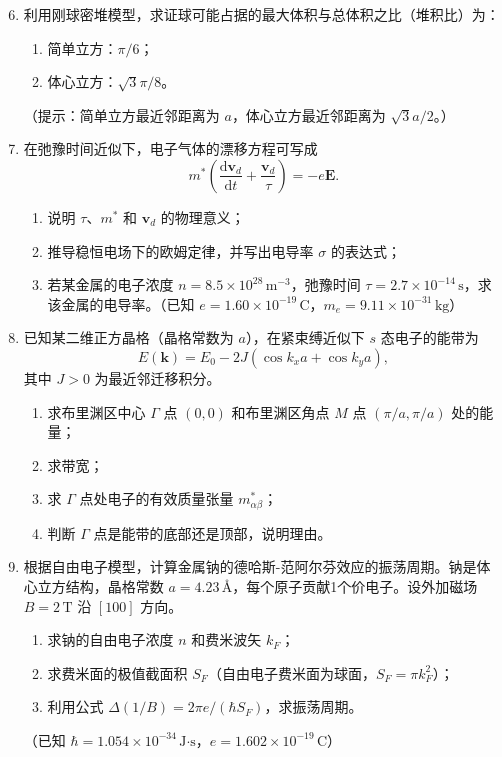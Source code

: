 \documentclass[12pt,a4paper,fontset=mac]{ctexart}
\newcommand{\kk}{\mathbf{k}}
\newcommand{\dd}{\mathrm{d}}
\newcommand{\calcanswer}{\vspace{8cm}}
\begin{document}
\begin{enumerate}
\setcounter{enumi}{5}
\item 利用刚球密堆模型，求证球可能占据的最大体积与总体积之比（堆积比）为：
\begin{enumerate}
\item 简单立方：$\pi/6$；
\item 体心立方：$\sqrt{3}\pi/8$。
\end{enumerate}
（提示：简单立方最近邻距离为 $a$，体心立方最近邻距离为 $\sqrt{3}a/2$。）
\calcanswer

\item 在弛豫时间近似下，电子气体的漂移方程可写成
\[
m^*\left(\frac{\dd\mathbf{v}_d}{\dd t} + \frac{\mathbf{v}_d}{\tau}\right) = -e\mathbf{E}.
\]
\begin{enumerate}
\item 说明 $\tau$、$m^*$ 和 $\mathbf{v}_d$ 的物理意义；
\item 推导稳恒电场下的欧姆定律，并写出电导率 $\sigma$ 的表达式；
\item 若某金属的电子浓度 $n = 8.5 \times 10^{28}\,\text{m}^{-3}$，弛豫时间 $\tau = 2.7 \times 10^{-14}\,\text{s}$，求该金属的电导率。（已知 $e = 1.60 \times 10^{-19}\,\text{C}$，$m_e = 9.11 \times 10^{-31}\,\text{kg}$）
\end{enumerate}
\calcanswer

\newpage

\item 已知某二维正方晶格（晶格常数为 $a$），在紧束缚近似下 $s$ 态电子的能带为
\[
E(\kk) = E_0 - 2J(\cos k_x a + \cos k_y a),
\]
其中 $J > 0$ 为最近邻迁移积分。
\begin{enumerate}
\item 求布里渊区中心 $\Gamma$ 点 $(0,0)$ 和布里渊区角点 $M$ 点 $(\pi/a, \pi/a)$ 处的能量；
\item 求带宽；
\item 求 $\Gamma$ 点处电子的有效质量张量 $m_{\alpha\beta}^*$；
\item 判断 $\Gamma$ 点是能带的底部还是顶部，说明理由。
\end{enumerate}
\calcanswer

\item 根据自由电子模型，计算金属钠的德哈斯-范阿尔芬效应的振荡周期。钠是体心立方结构，晶格常数 $a = 4.23\,\text{Å}$，每个原子贡献1个价电子。设外加磁场 $B = 2\,\text{T}$ 沿 $[100]$ 方向。
\begin{enumerate}
\item 求钠的自由电子浓度 $n$ 和费米波矢 $k_F$；
\item 求费米面的极值截面积 $S_F$（自由电子费米面为球面，$S_F = \pi k_F^2$）；
\item 利用公式 $\Delta(1/B) = 2\pi e/(\hbar S_F)$，求振荡周期。
\end{enumerate}
（已知 $\hbar = 1.054 \times 10^{-34}\,\text{J·s}$，$e = 1.602 \times 10^{-19}\,\text{C}$）
\calcanswer

\end{enumerate}
\end{document}
